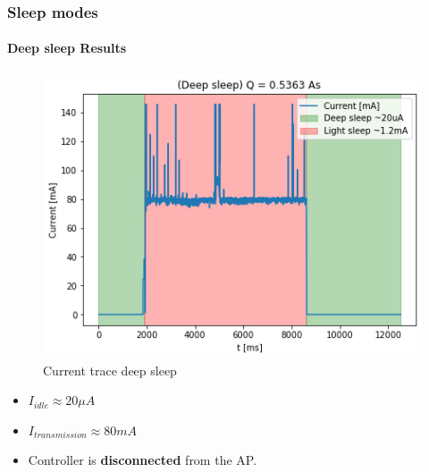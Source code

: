 \begin{frame}
    \frametitle{Sleep modes}
    \framesubtitle{Deep sleep Results}

    \begin{minipage}{0.45 \textwidth}
        \begin{figure}[H]
            \centering
            \includegraphics[width = 1 \linewidth]{../paper/fig/deep_sleep.png}
            \caption{Current trace deep sleep}
            \label{fig:experiment_modem_light_sleep}
        \end{figure}
    \end{minipage}
    \begin{minipage}{0.45 \textwidth}
        \begin{itemize}
            \item $I_{idle} \approx 20 \mu A$
            \item $I_{transmission} \approx 80mA$
            \item Controller is \textbf{disconnected} from the AP.
        \end{itemize}
    \end{minipage}
\end{frame}


